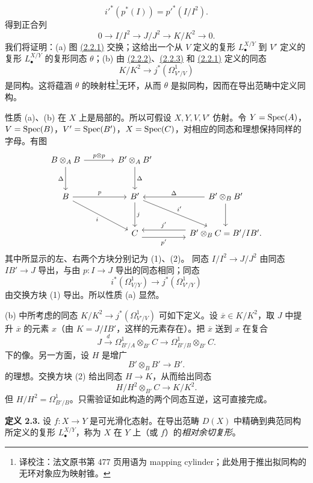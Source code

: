 \[
i'^*(p^*(I))=p'^*(I/I^2).
\]
得到正合列
\begin{equation}\tag{2.2.3}
0\longrightarrow I/I^2\longrightarrow J/J^2\longrightarrow K/K^2\longrightarrow0.
\end{equation}
我们将证明：(a) 图 \hyperlink{sga6.e08.eq.2-2-1}{(2.2.1)} 交换；这给出一个从 $V$ 定义的复形 $L^{X/Y}_\bullet$ 到 $V'$ 定义的复形 $L^{X/Y}_\bullet$ 的复形同态 $\theta$；(b) 由 \hyperlink{sga6.e08.eq.2-2-2}{(2.2.2)}、\hyperlink{sga6.e08.eq.2-2-3}{(2.2.3)} 和 \hyperlink{sga6.e08.eq.2-2-1}{(2.2.1)} 定义的同态
\[
K/K^2\longrightarrow j^*(\Omega^1_{V'/V})
\]
是同构。这将蕴涵 $\theta$ 的映射柱\footnote{译校注：法文原书第 477 页用语为 mapping cylinder；此处用于推出拟同构的无环对象应为映射锥。}无环，从而 $\theta$ 是拟同构，因而在导出范畴中定义同构。

性质 (a)、(b) 在 $X$ 上是局部的。所以可假设 $X,Y,V,V'$ 仿射。令 $Y=\operatorname{Spec}(A)$，$V=\operatorname{Spec}(B)$，$V'=\operatorname{Spec}(B')$，$X=\operatorname{Spec}(C)$，对相应的同态和理想保持同样的字母。有图
\[
\begin{tikzcd}[column sep=large,row sep=large]
B\otimes_A B \arrow[r,"p\otimes p"] \arrow[d,"\Delta"'] & B'\otimes_A B' \arrow[d,"\Delta"] & {}\\
B \arrow[r,"p"] \arrow[dr,"i"'] & B' \arrow[d,"j"] \arrow[dr,"i'"] & B'\otimes_B B' \arrow[l,"\Delta"'] \arrow[d]\\
{} & C \arrow[r,"p'"',shift right=1ex] & B'\otimes_B C=B'/IB' \arrow[l,"j'"',shift right=1ex].
\end{tikzcd}
\]
其中所显示的左、右两个方块分别记为 (1)、(2)。
同态 $I/I^2\to J/J^2$ 由同态 $IB'\to J$ 导出，与由 $p:I\to J$ 导出的同态相同；同态
\[
i^*(\Omega^1_{V/Y})\longrightarrow j^*(\Omega^1_{V'/Y})
\]
由交换方块 (1) 导出。所以性质 (a) 显然。

(b) 中所考虑的同态 $K/K^2\to j^*(\Omega^1_{V'/V})$ 可如下定义。设 $\overline x\in K/K^2$，取 $J$ 中提升 $\overline x$ 的元素 $x$（由 $K=J/IB'$，这样的元素存在）。把 $\overline x$ 送到 $x$ 在复合
\[
J\xrightarrow{d}\Omega^1_{B'/A}\otimes_{B'}C
\longrightarrow\Omega^1_{B'/B}\otimes_{B'}C.
\]
下的像。另一方面，设 $H$ 是增广
\[
B'\otimes_B B'\longrightarrow B'.
\]
的理想。交换方块 (2) 给出同态 $H\to K$，从而给出同态
\[
H/H^2\otimes_{B'}C\longrightarrow K/K^2.
\]
但 $H/H^2=\Omega^1_{B'/B}$。只需验证如此构造的两个同态互逆，这可直接完成。

\textbf{定义 2.3.} 设 $f:X\to Y$ 是可光滑化态射。在导出范畴 $D(X)$ 中精确到典范同构所定义的复形 $L^{X/Y}_\bullet$，称为 $X$ 在 $Y$ 上（或 $f$）的\emph{相对余切复形}。

